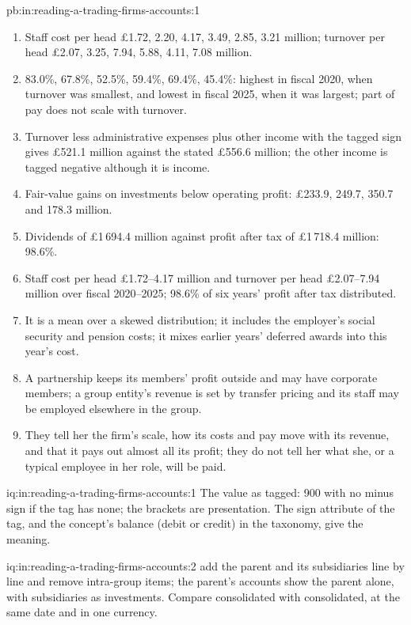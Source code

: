 \begin{solution}{pb:in:reading-a-trading-firms-accounts:1}
\begin{enumerate}
\item Staff cost per head \pounds1.72, 2.20, 4.17, 3.49, 2.85, 3.21 million; turnover per head \pounds2.07, 3.25, 7.94,
5.88, 4.11, 7.08 million.
\item 83.0\%, 67.8\%, 52.5\%, 59.4\%, 69.4\%, 45.4\%: highest in fiscal 2020, when turnover was smallest, and lowest in
fiscal 2025, when it was largest; part of pay does not scale with turnover.
\item Turnover less administrative expenses plus other income with the tagged sign gives \pounds521.1 million against the
stated \pounds556.6 million; the other income is tagged negative although it is income.
\item Fair-value gains on investments below operating profit: \pounds233.9, 249.7, 350.7 and 178.3 million.
\item Dividends of \pounds1\,694.4 million against profit after tax of \pounds1\,718.4 million: 98.6\%.
\item Staff cost per head \pounds1.72--4.17 million and turnover per head \pounds2.07--7.94 million over fiscal 2020--2025;
98.6\% of six years' profit after tax distributed.
\item It is a mean over a skewed distribution; it includes the employer's social security and pension costs; it mixes
earlier years' deferred awards into this year's cost.
\item A partnership keeps its members' profit outside  and may have corporate members; a group entity's
revenue is set by transfer pricing and its staff may be employed elsewhere in the group.
\item They tell her the firm's scale, how its costs and pay move with its revenue, and that it pays out almost all its
profit; they do not tell her what she, or a typical employee in her role, will be paid.
\end{enumerate}
\end{solution}

\begin{solution}{iq:in:reading-a-trading-firms-accounts:1}
The value as tagged: 900 with no minus sign if the tag has none; the brackets are presentation. The sign attribute of
the tag, and the concept's balance (debit or credit) in the taxonomy, give the meaning.
\end{solution}

\begin{solution}{iq:in:reading-a-trading-firms-accounts:2}
 add the parent and its subsidiaries line by line and remove intra-group items; the parent's
accounts show the parent alone, with subsidiaries as investments. Compare consolidated with consolidated, at the same
date and in one currency.
\end{solution}

